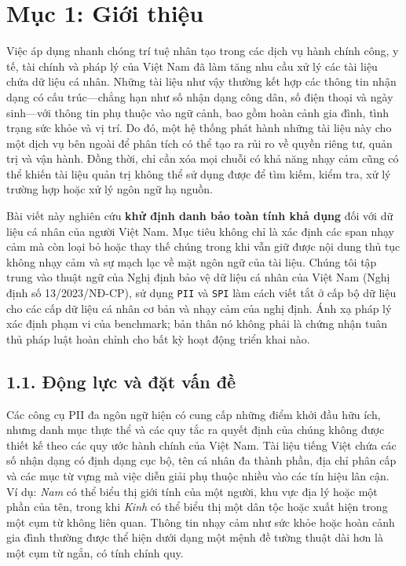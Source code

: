 \documentclass[
  11pt,
  a4paper,
]{article}
\author{}
\date{}
\begin{document}
\section{Mục 1: Giới thiệu}\label{mux1ee5c-1-giux1edbi-thiux1ec7u}

Việc áp dụng nhanh chóng trí tuệ nhân tạo trong các dịch vụ hành chính
công, y tế, tài chính và pháp lý của Việt Nam đã làm tăng nhu cầu xử lý
các tài liệu chứa dữ liệu cá nhân. Những tài liệu như vậy thường kết hợp
các thông tin nhận dạng có cấu trúc---chẳng hạn như số nhận dạng công
dân, số điện thoại và ngày sinh---với thông tin phụ thuộc vào ngữ cảnh,
bao gồm hoàn cảnh gia đình, tình trạng sức khỏe và vị trí. Do đó, một hệ
thống phát hành những tài liệu này cho một dịch vụ bên ngoài để phân
tích có thể tạo ra rủi ro về quyền riêng tư, quản trị và vận hành. Đồng
thời, chỉ cần xóa mọi chuỗi có khả năng nhạy cảm cũng có thể khiến tài
liệu quản trị không thể sử dụng được để tìm kiếm, kiểm tra, xử lý trường
hợp hoặc xử lý ngôn ngữ hạ nguồn.

Bài viết này nghiên cứu \textbf{khử định danh bảo toàn tính khả dụng}
đối với dữ liệu cá nhân của người Việt Nam. Mục tiêu không chỉ là xác
định các span nhạy cảm mà còn loại bỏ hoặc thay thế chúng trong khi vẫn
giữ được nội dung thủ tục không nhạy cảm và sự mạch lạc về mặt ngôn ngữ
của tài liệu. Chúng tôi tập trung vào thuật ngữ của Nghị định bảo vệ dữ
liệu cá nhân của Việt Nam (Nghị định số 13/2023/NĐ-CP), sử dụng
\texttt{PII} và \texttt{SPI} làm cách viết tắt ở cấp bộ dữ liệu cho các
cấp dữ liệu cá nhân cơ bản và nhạy cảm của nghị định. Ánh xạ pháp lý xác
định phạm vi của benchmark; bản thân nó không phải là chứng nhận tuân
thủ pháp luật hoàn chỉnh cho bất kỳ hoạt động triển khai nào.

\subsection{1.1. Động lực và đặt vấn
đề}\label{ux111ux1ed9ng-lux1ef1c-vuxe0-ux111ux1eb7t-vux1ea5n-ux111ux1ec1}

Các công cụ PII đa ngôn ngữ hiện có cung cấp những điểm khởi đầu hữu
ích, nhưng danh mục thực thể và các quy tắc ra quyết định của chúng
không được thiết kế theo các quy ước hành chính của Việt Nam. Tài liệu
tiếng Việt chứa các số nhận dạng có định dạng cục bộ, tên cá nhân đa
thành phần, địa chỉ phân cấp và các mục từ vựng mà việc diễn giải phụ
thuộc nhiều vào các tín hiệu lân cận. Ví dụ: \emph{Nam} có thể biểu thị
giới tính của một người, khu vực địa lý hoặc một phần của tên, trong khi
\emph{Kinh} có thể biểu thị một dân tộc hoặc xuất hiện trong một cụm từ
không liên quan. Thông tin nhạy cảm như sức khỏe hoặc hoàn cảnh gia đình
thường được thể hiện dưới dạng một mệnh đề tường thuật dài hơn là một
cụm từ ngắn, có tính chính quy.
\end{document}
